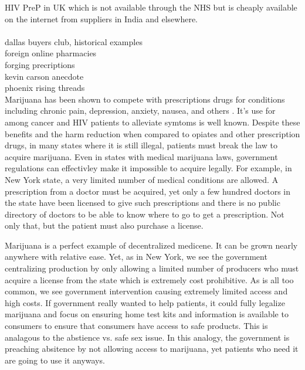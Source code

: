 \documentclass{article}
\begin{document}
HIV PreP in UK which is not available through the NHS but is cheaply available on the internet from suppliers in India and elsewhere.\\


\cite{wilson2017}\\

dallas buyers club, historical examples\\
foreign online pharmacies\\
forging precriptions\\
kevin carson anecdote\\
phoenix rising threads\\

Marijuana has been shown to compete with prescriptions drugs for conditions including chronic pain, depression, anxiety, nausea, and others \cite{bradford2016medical}. It's use for among cancer and HIV patients to alleviate symtoms is well known. Despite these benefits and the harm reduction when compared to opiates and other prescription drugs, in many states where it is still illegal, patients must break the law to acquire marijuana. Even in states with medical marijuana laws, government regulations can effectivley make it impossible to acquire legally. For example, in New York state, a very limited number of medical conditions are allowed. A prescription from a doctor must be acquired, yet only a few hundred doctors in the state have been licensed to give such prescriptions and there is no public directory of doctors to be able to know where to go to get a prescription. Not only that, but the patient must also purchase a license. 

Marijuana is a perfect example of decentralized medicene. It can be grown nearly anywhere with relative ease. Yet, as in New York, we see the government centralizing production by only allowing a limited number of producers who must acquire a license from the state which is extremely cost prohibitive. As is all too common, we see government intervention causing extremely limited access and high costs. If government really wanted to help patients, it could fully legalize marijuana and focus on ensuring home test kits and information is available to consumers to ensure that consumers have access to safe products. This is analagous to the abstience vs. safe sex issue. In this analogy, the government is preaching absitence by not allowing access to marijuana, yet patients who need it are going to use it anyways.
\end{document}
